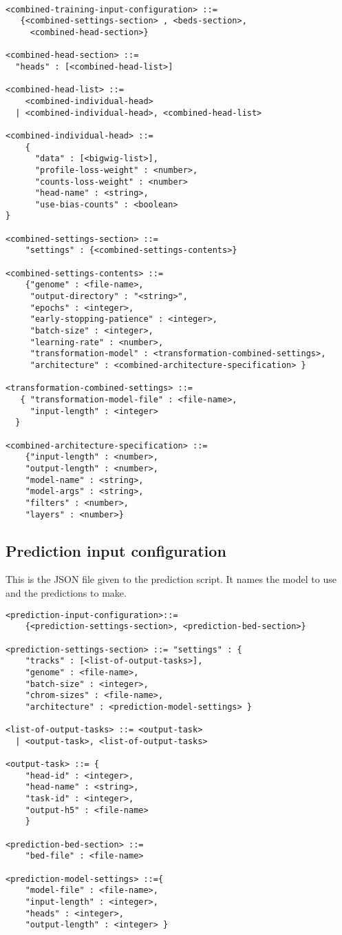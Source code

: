 \documentclass{article}
\begin{document}
\begin{lstlisting}

<combined-training-input-configuration> ::= 
   {<combined-settings-section> , <beds-section>, 
     <combined-head-section>}

<combined-head-section> ::= 
  "heads" : [<combined-head-list>]

<combined-head-list> ::= 
    <combined-individual-head>
  | <combined-individual-head>, <combined-head-list>

<combined-individual-head> ::=
    {
      "data" : [<bigwig-list>],
      "profile-loss-weight" : <number>,
      "counts-loss-weight" : <number>
      "head-name" : <string>,
      "use-bias-counts" : <boolean>
}

<combined-settings-section> ::= 
    "settings" : {<combined-settings-contents>}

<combined-settings-contents> ::= 
    {"genome" : <file-name>, 
     "output-directory" : "<string>",
     "epochs" : <integer>, 
     "early-stopping-patience" : <integer>, 
     "batch-size" : <integer>, 
     "learning-rate" : <number>, 
     "transformation-model" : <transformation-combined-settings>,
     "architecture" : <combined-architecture-specification> } 

<transformation-combined-settings> ::= 
   { "transformation-model-file" : <file-name>, 
     "input-length" : <integer>
  }

<combined-architecture-specification> ::= 
    {"input-length" : <number>, 
    "output-length" : <number>,
    "model-name" : <string>,
    "model-args" : <string>,
    "filters" : <number>,
    "layers" : <number>}
\end{lstlisting}

\subsection{Prediction input configuration}
This is the JSON file given to the prediction script. It names the model to use and the predictions to make. 

\begin{lstlisting}
<prediction-input-configuration>::=
    {<prediction-settings-section>, <prediction-bed-section>}

<prediction-settings-section> ::= "settings" : {
    "tracks" : [<list-of-output-tasks>],
    "genome" : <file-name>,
    "batch-size" : <integer>,
    "chrom-sizes" : <file-name>,
    "architecture" : <prediction-model-settings> }

<list-of-output-tasks> ::= <output-task> 
  | <output-task>, <list-of-output-tasks>

<output-task> ::= {
    "head-id" : <integer>,
    "head-name" : <string>,
    "task-id" : <integer>,
    "output-h5" : <file-name>
    }

<prediction-bed-section> ::=
    "bed-file" : <file-name>

<prediction-model-settings> ::={
    "model-file" : <file-name>,
    "input-length" : <integer>,
    "heads" : <integer>,
    "output-length" : <integer> }
\end{lstlisting}
\end{document}
